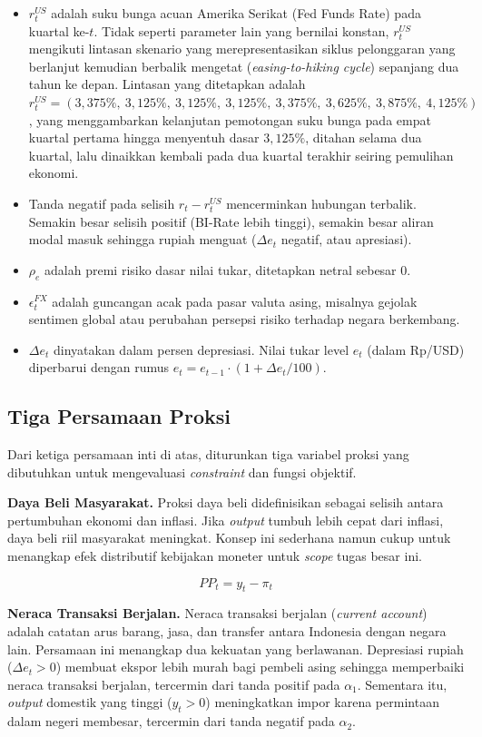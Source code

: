 \begin{itemize}
    \item $r_t^{US}$ adalah suku bunga acuan Amerika Serikat (Fed Funds Rate) pada kuartal ke-$t$. Tidak seperti parameter lain yang bernilai konstan, $r_t^{US}$ mengikuti lintasan skenario yang merepresentasikan siklus pelonggaran yang berlanjut kemudian berbalik mengetat (\textit{easing-to-hiking cycle}) sepanjang dua tahun ke depan. Lintasan yang ditetapkan adalah $r_t^{US} = (3{,}375\%,\ 3{,}125\%,\ 3{,}125\%,\ 3{,}125\%,\ 3{,}375\%,\ 3{,}625\%,\ 3{,}875\%,\ 4{,}125\%)$, yang menggambarkan kelanjutan pemotongan suku bunga pada empat kuartal pertama hingga menyentuh dasar $3{,}125\%$, ditahan selama dua kuartal, lalu dinaikkan kembali pada dua kuartal terakhir seiring pemulihan ekonomi.
    \item Tanda negatif pada selisih $r_t - r_t^{US}$ mencerminkan hubungan terbalik. Semakin besar selisih positif (BI-Rate lebih tinggi), semakin besar aliran modal masuk sehingga rupiah menguat ($\Delta e_t$ negatif, atau apresiasi).
    \item $\rho_e$ adalah premi risiko dasar nilai tukar, ditetapkan netral sebesar 0.
    \item $\epsilon_t^{FX}$ adalah guncangan acak pada pasar valuta asing, misalnya gejolak sentimen global atau perubahan persepsi risiko terhadap negara berkembang.
    \item $\Delta e_t$ dinyatakan dalam persen depresiasi. Nilai tukar level $e_t$ (dalam Rp/USD) diperbarui dengan rumus $e_t = e_{t-1} \cdot (1 + \Delta e_t / 100)$.
\end{itemize}

\subsection{Tiga Persamaan Proksi}

Dari ketiga persamaan inti di atas, diturunkan tiga variabel proksi yang dibutuhkan untuk mengevaluasi \textit{constraint} dan fungsi objektif.

\textbf{Daya Beli Masyarakat.} Proksi daya beli didefinisikan sebagai selisih antara pertumbuhan ekonomi dan inflasi. Jika \textit{output} tumbuh lebih cepat dari inflasi, daya beli riil masyarakat meningkat. Konsep ini sederhana namun cukup untuk menangkap efek distributif kebijakan moneter untuk \textit{scope} tugas besar ini.

\[
    PP_t = y_t - \pi_t
\]

\textbf{Neraca Transaksi Berjalan.} Neraca transaksi berjalan (\textit{current account}) adalah catatan arus barang, jasa, dan transfer antara Indonesia dengan negara lain. Persamaan ini menangkap dua kekuatan yang berlawanan. Depresiasi rupiah ($\Delta e_t > 0$) membuat ekspor lebih murah bagi pembeli asing sehingga memperbaiki neraca transaksi berjalan, tercermin dari tanda positif pada $\alpha_1$. Sementara itu, \textit{output} domestik yang tinggi ($y_t > 0$) meningkatkan impor karena permintaan dalam negeri membesar, tercermin dari tanda negatif pada $\alpha_2$.

